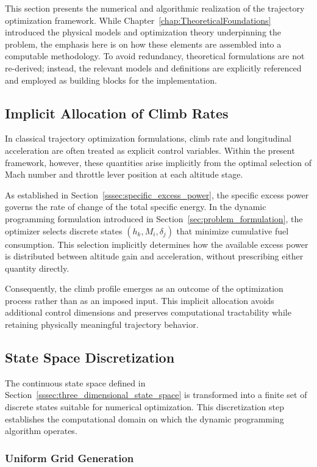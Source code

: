 This section presents the numerical and algorithmic realization of the trajectory optimization framework. While Chapter~\ref{chap:TheoreticalFoundations} introduced the physical models and optimization theory underpinning the problem, the emphasis here is on how these elements are assembled into a computable methodology. To avoid redundancy, theoretical formulations are not re-derived; instead, the relevant models and definitions are explicitly referenced and employed as building blocks for the implementation.

\subsection{Implicit Allocation of Climb Rates}

In classical trajectory optimization formulations, climb rate and longitudinal acceleration are often treated as explicit control variables. Within the present framework, however, these quantities arise implicitly from the optimal selection of Mach number and throttle lever position at each altitude stage.

As established in Section~\ref{sssec:specific_excess_power}, the specific excess power governs the rate of change of the total specific energy. In the dynamic programming formulation introduced in Section~\ref{sec:problem_formulation}, the optimizer selects discrete states $(h_k, M_i, \delta_j)$ that minimize cumulative fuel consumption. This selection implicitly determines how the available excess power is distributed between altitude gain and acceleration, without prescribing either quantity directly.

Consequently, the climb profile emerges as an outcome of the optimization process rather than as an imposed input. This implicit allocation avoids additional control dimensions and preserves computational tractability while retaining physically meaningful trajectory behavior.

\subsection{State Space Discretization}

The continuous state space defined in Section~\ref{sssec:three_dimensional_state_space} is transformed into a finite set of discrete states suitable for numerical optimization. This discretization step establishes the computational domain on which the dynamic programming algorithm operates.

\subsubsection{Uniform Grid Generation}

